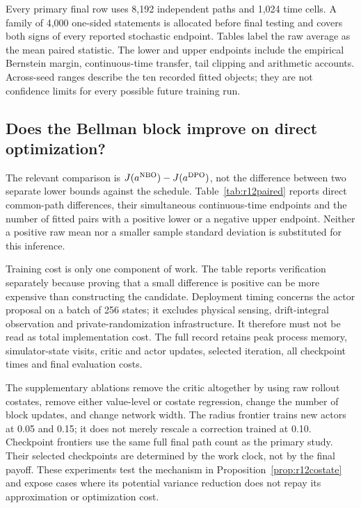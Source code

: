 Every primary final row uses 8,192 independent paths and 1,024 time cells. A family of 4,000 one-sided statements is allocated before final testing and covers both signs of every reported stochastic endpoint. Tables label the raw average as the mean paired statistic. The lower and upper endpoints include the empirical Bernstein margin, continuous-time transfer, tail clipping and arithmetic accounts. Across-seed ranges describe the ten recorded fitted objects; they are not confidence limits for every possible future training run.




\subsection{Does the Bellman block improve on direct optimization?}
The relevant comparison is $J(a^{\rm NBO})-J(a^{\rm DPO})$, not the difference between two separate lower bounds against the schedule. Table~\ref{tab:r12paired} reports direct common-path differences, their simultaneous continuous-time endpoints and the number of fitted pairs with a positive lower or a negative upper endpoint. Neither a positive raw mean nor a smaller sample standard deviation is substituted for this inference.




Training cost is only one component of work. The table reports verification separately because proving that a small difference is positive can be more expensive than constructing the candidate. Deployment timing concerns the actor proposal on a batch of 256 states; it excludes physical sensing, drift-integral observation and private-randomization infrastructure. It therefore must not be read as total implementation cost. The full record retains peak process memory, simulator-state visits, critic and actor updates, selected iteration, all checkpoint times and final evaluation costs.

The supplementary ablations remove the critic altogether by using raw rollout costates, remove either value-level or costate regression, change the number of block updates, and change network width. The radius frontier trains new actors at 0.05 and 0.15; it does not merely rescale a correction trained at 0.10. Checkpoint frontiers use the same full final path count as the primary study. Their selected checkpoints are determined by the work clock, not by the final payoff. These experiments test the mechanism in Proposition~\ref{prop:r12costate} and expose cases where its potential variance reduction does not repay its approximation or optimization cost.

